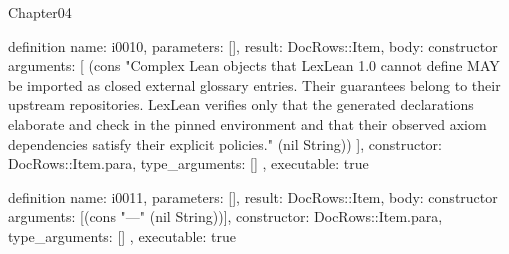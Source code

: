 \begin{lexlean}{Chapter04}
\begin{semanticmodule}
definition{
  name: i0010,
  parameters: [],
  result: DocRows::Item,
  body: constructor{
    arguments: [
      (cons "Complex Lean objects that LexLean 1.0 cannot define MAY be imported as closed external glossary entries. Their guarantees belong to their upstream repositories. LexLean verifies only that the generated declarations elaborate and check in the pinned environment and that their observed axiom dependencies satisfy their explicit policies." (nil String))
    ],
    constructor: DocRows::Item.para,
    type_arguments: []
  },
  executable: true
}

definition{
  name: i0011,
  parameters: [],
  result: DocRows::Item,
  body: constructor{
    arguments: [(cons "---" (nil String))],
    constructor: DocRows::Item.para,
    type_arguments: []
  },
  executable: true
}
\end{semanticmodule}
\end{lexlean}
